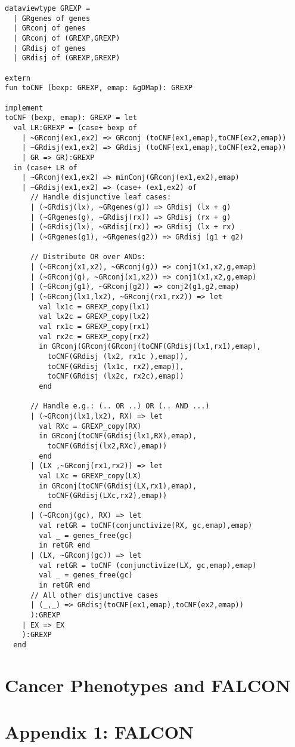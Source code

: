 \documentclass[phd,tocprelim]{cornell}
\theoremstyle{break}
\theoremstyle{empty}
\begin{document}
\begin{verbatim}
dataviewtype GREXP = 
  | GRgenes of genes
  | GRconj of genes
  | GRconj of (GREXP,GREXP)
  | GRdisj of genes
  | GRdisj of (GREXP,GREXP)

extern
fun toCNF (bexp: GREXP, emap: &gDMap): GREXP

implement
toCNF (bexp, emap): GREXP = let     
  val LR:GREXP = (case+ bexp of 
    | ~GRconj(ex1,ex2) => GRconj (toCNF(ex1,emap),toCNF(ex2,emap))
    | ~GRdisj(ex1,ex2) => GRdisj (toCNF(ex1,emap),toCNF(ex2,emap))   
    | GR => GR):GREXP
  in (case+ LR of  
    | ~GRconj(ex1,ex2) => minConj(GRconj(ex1,ex2),emap) 
    | ~GRdisj(ex1,ex2) => (case+ (ex1,ex2) of
      // Handle disjunctive leaf cases:         
      | (~GRdisj(lx), ~GRgenes(g)) => GRdisj (lx + g) 
      | (~GRgenes(g), ~GRdisj(rx)) => GRdisj (rx + g)
      | (~GRdisj(lx), ~GRdisj(rx)) => GRdisj (lx + rx)
      | (~GRgenes(g1), ~GRgenes(g2)) => GRdisj (g1 + g2)

      // Distribute OR over ANDs:
      | (~GRconj(x1,x2), ~GRconj(g)) => conj1(x1,x2,g,emap) 
      | (~GRconj(g), ~GRconj(x1,x2)) => conj1(x1,x2,g,emap) 
      | (~GRconj(g1), ~GRconj(g2)) => conj2(g1,g2,emap)
      | (~GRconj(lx1,lx2), ~GRconj(rx1,rx2)) => let
        val lx1c = GREXP_copy(lx1)
        val lx2c = GREXP_copy(lx2) 
        val rx1c = GREXP_copy(rx1)
        val rx2c = GREXP_copy(rx2) 
        in GRconj(GRconj(GRconj(toCNF(GRdisj(lx1,rx1),emap), 
          toCNF(GRdisj (lx2, rx1c ),emap)),
          toCNF(GRdisj (lx1c, rx2),emap)), 
          toCNF(GRdisj (lx2c, rx2c),emap)) 
        end

      // Handle e.g.: (.. OR ..) OR (.. AND ...) 
      | (~GRconj(lx1,lx2), RX) => let
        val RXc = GREXP_copy(RX)
        in GRconj(toCNF(GRdisj(lx1,RX),emap),
          toCNF(GRdisj(lx2,RXc),emap)) 
        end
      | (LX ,~GRconj(rx1,rx2)) => let
        val LXc = GREXP_copy(LX)
        in GRconj(toCNF(GRdisj(LX,rx1),emap),
          toCNF(GRdisj(LXc,rx2),emap)) 
        end
      | (~GRconj(gc), RX) => let
        val retGR = toCNF(conjunctivize(RX, gc,emap),emap)
        val _ = genes_free(gc)
        in retGR end
      | (LX, ~GRconj(gc)) => let
        val retGR = toCNF (conjunctivize(LX, gc,emap),emap)
        val _ = genes_free(gc)
        in retGR end
      // All other disjunctive cases
      | (_,_) => GRdisj(toCNF(ex1,emap),toCNF(ex2,emap))
      ):GREXP
    | EX => EX
    ):GREXP
  end
\end{verbatim}


\chapter{Cancer Phenotypes and FALCON}

\appendix

\chapter{Appendix 1: FALCON}


\end{document}
